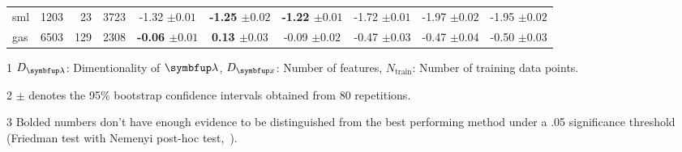 \begin{table*}
\begin{threeparttable}
\begin{tabular}{lrrrcccccc}
    sml & 1203 & 23 & 3723 & {-1.32 {\scriptsize{\(\pm 0.01\)}}} & {\bf-1.25 {\scriptsize{\(\pm 0.02\)}}} & {\bf-1.22 {\scriptsize{\(\pm 0.01\)}}} & {-1.72 {\scriptsize{\(\pm 0.01\)}}} & {-1.97 {\scriptsize{\(\pm 0.02\)}}} & {-1.95 {\scriptsize{\(\pm 0.02\)}}} \\
    gas & 6503 & 129 & 2308 & {\bf-0.06 {\scriptsize{\(\pm 0.01\)}}} & {\bf 0.13 {\scriptsize{\(\pm 0.03\)}}} & {-0.09 {\scriptsize{\(\pm 0.02\)}}} & {-0.47 {\scriptsize{\(\pm 0.03\)}}} & {-0.47 {\scriptsize{\(\pm 0.04\)}}} & {-0.50 {\scriptsize{\(\pm 0.03\)}}}\\
    \bottomrule
 \end{tabular}
  \begin{tablenotes}
    \item[1] {\footnotesize \(D_{\vlambda}\): Dimentionality of \(\vlambda\), \(D_{\vx}\): Number of features, \(N_{\text{train}}\): Number of training data points.}
    \item[2] {\footnotesize \(\pm\) denotes the 95\% bootstrap confidence intervals obtained from 80 repetitions.}
    \item[3] {\footnotesize Bolded numbers don't have enough evidence to be distinguished from the best performing method under a .05 significance threshold (Friedman test with Nemenyi post-hoc test,~\citealt{JMLR:v7:demsar06a})}.
  \end{tablenotes}
  \end{threeparttable}
  \vspace{-0.1in}
\end{table*}

